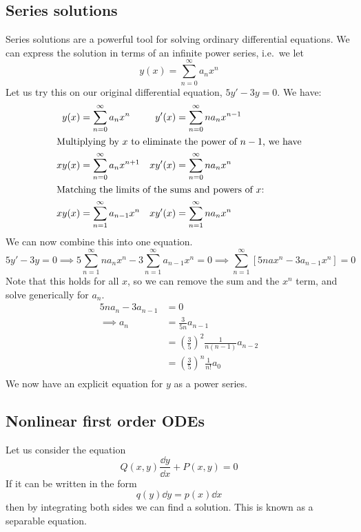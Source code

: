 \subsection{Series solutions}
Series solutions are a powerful tool for solving ordinary differential equations.
We can express the solution in terms of an infinite power series, i.e.\ we let
\[
	y(x) = \sum_{n=0}^\infty a_n x^n
\]
Let us try this on our original differential equation, \(5y' - 3y = 0\).
We have:
\begin{align*}
	y(x)  & = \sum_{n=0}^\infty a_n x^n     & y'(x)  & = \sum_{n=0}^\infty na_n x^{n-1} \\
	\intertext{Multiplying by \(x\) to eliminate the power of \(n-1\), we have}
	xy(x) & = \sum_{n=0}^\infty a_n x^{n+1} & xy'(x) & = \sum_{n=0}^\infty na_n x^n     \\
	\intertext{Matching the limits of the sums and powers of \(x\):}
	xy(x) & = \sum_{n=1}^\infty a_{n-1}x^n  & xy'(x) & = \sum_{n=1}^\infty na_n x^n     \\
\end{align*}
We can now combine this into one equation.
\[
	5y' - 3y = 0 \implies 5\sum_{n=1}^\infty na_n x^n - 3\sum_{n=1}^\infty a_{n-1}x^n = 0 \implies \sum_{n=1}^\infty \left[ 5nax^n - 3a_{n-1}x^n \right] = 0
\]
Note that this holds for all \(x\), so we can remove the sum and the \(x^n\) term, and solve generically for \(a_n\).
\begin{align*}
	5na_n - 3a_{n-1} & = 0                                                   \\
	\implies a_n     & = \frac{3}{5n} a_{n-1}                                \\
	                 & = \left(\frac{3}{5}\right)^2 \frac{1}{n(n-1)} a_{n-2} \\
	                 & = \left(\frac{3}{5}\right)^n \frac{1}{n!} a_{0}       \\
\end{align*}
We now have an explicit equation for \(y\) as a power series.

\subsection{Nonlinear first order ODEs}
Let us consider the equation
\[
	Q(x, y)\frac{\dd{y}}{\dd{x}} + P(x, y) = 0
\]
If it can be written in the form
\[
	q(y) \dd{y} = p(x) \dd{x}
\]
then by integrating both sides we can find a solution.
This is known as a separable equation.

